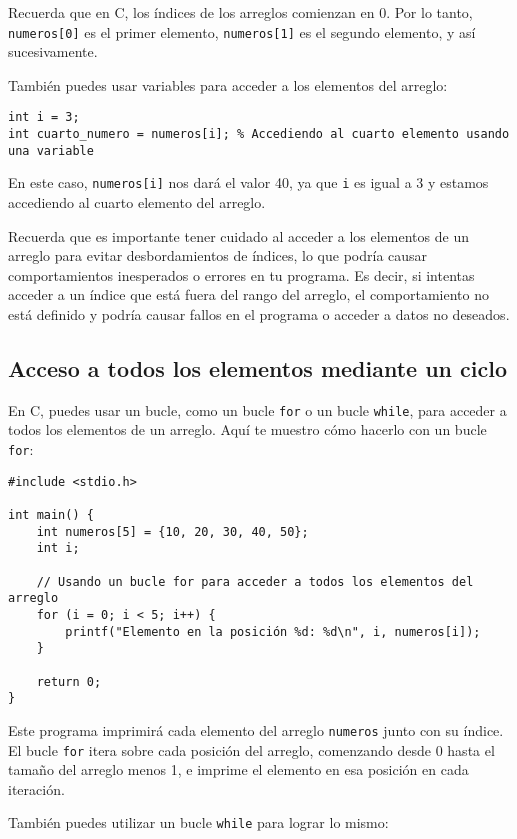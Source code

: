 \documentclass{article}
\begin{document}
Recuerda que en C, los índices de los arreglos comienzan en 0. Por lo tanto, \texttt{numeros[0]} es el primer elemento, \texttt{numeros[1]} es el segundo elemento, y así sucesivamente.

También puedes usar variables para acceder a los elementos del arreglo:

\begin{verbatim}
int i = 3;
int cuarto_numero = numeros[i]; % Accediendo al cuarto elemento usando una variable
\end{verbatim}

En este caso, \texttt{numeros[i]} nos dará el valor 40, ya que \texttt{i} es igual a 3 y estamos accediendo al cuarto elemento del arreglo.

Recuerda que es importante tener cuidado al acceder a los elementos de un arreglo para evitar desbordamientos de índices, lo que podría causar comportamientos inesperados o errores en tu programa. Es decir, si intentas acceder a un índice que está fuera del rango del arreglo, el comportamiento no está definido y podría causar fallos en el programa o acceder a datos no deseados.

\subsection{Acceso a todos los elementos mediante un ciclo}

En C, puedes usar un bucle, como un bucle \texttt{for} o un bucle \texttt{while}, para acceder a todos los elementos de un arreglo. Aquí te muestro cómo hacerlo con un bucle \texttt{for}:

\begin{verbatim}
#include <stdio.h>

int main() {
    int numeros[5] = {10, 20, 30, 40, 50};
    int i;

    // Usando un bucle for para acceder a todos los elementos del arreglo
    for (i = 0; i < 5; i++) {
        printf("Elemento en la posición %d: %d\n", i, numeros[i]);
    }

    return 0;
}
\end{verbatim}

Este programa imprimirá cada elemento del arreglo \texttt{numeros} junto con su índice. El bucle \texttt{for} itera sobre cada posición del arreglo, comenzando desde 0 hasta el tamaño del arreglo menos 1, e imprime el elemento en esa posición en cada iteración.

También puedes utilizar un bucle \texttt{while} para lograr lo mismo:
\end{document}
